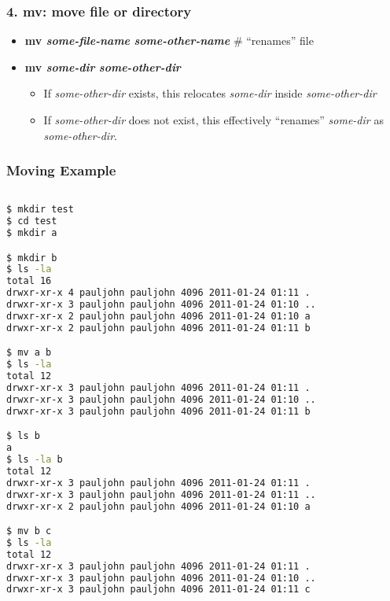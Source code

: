 \documentclass[English]{beamer}
\begin{document}
\begin{frame}[containsverbatim]
  \frametitle {4. mv: move file or directory}
  \begin{itemize}
    
  \item \textbf{mv \emph{some-file-name} \emph{some-other-name}} \#
    ``renames'' file
    
  \item \textbf{mv \emph{some-dir} \emph{some-other-dir}}  
    \begin{itemize}
    \item If \emph{some-other-dir} exists, this 
      relocates \emph{some-dir} inside \emph{some-other-dir}
    \item If \emph{some-other-dir} does not exist, this effectively
      ``renames'' \emph{some-dir} as  \emph{some-other-dir}.
    \end{itemize}
  \end{itemize}
\end{frame}
  

\begin{frame}
  
  \frametitle {Moving Example} 
  
\begin{lstlisting}[basicstyle={\tiny},breaklines=true,language=bash]
    
$ mkdir test
$ cd test
$ mkdir a

$ mkdir b
$ ls -la
total 16
drwxr-xr-x 4 pauljohn pauljohn 4096 2011-01-24 01:11 .
drwxr-xr-x 3 pauljohn pauljohn 4096 2011-01-24 01:10 ..
drwxr-xr-x 2 pauljohn pauljohn 4096 2011-01-24 01:10 a
drwxr-xr-x 2 pauljohn pauljohn 4096 2011-01-24 01:11 b

$ mv a b
$ ls -la 
total 12
drwxr-xr-x 3 pauljohn pauljohn 4096 2011-01-24 01:11 .
drwxr-xr-x 3 pauljohn pauljohn 4096 2011-01-24 01:10 ..
drwxr-xr-x 3 pauljohn pauljohn 4096 2011-01-24 01:11 b

$ ls b
a
$ ls -la b
total 12
drwxr-xr-x 3 pauljohn pauljohn 4096 2011-01-24 01:11 .
drwxr-xr-x 3 pauljohn pauljohn 4096 2011-01-24 01:11 ..
drwxr-xr-x 2 pauljohn pauljohn 4096 2011-01-24 01:10 a

$ mv b c
$ ls -la
total 12
drwxr-xr-x 3 pauljohn pauljohn 4096 2011-01-24 01:11 .
drwxr-xr-x 3 pauljohn pauljohn 4096 2011-01-24 01:10 ..
drwxr-xr-x 3 pauljohn pauljohn 4096 2011-01-24 01:11 c

\end{lstlisting}
 
\end{frame}
\end{document}
